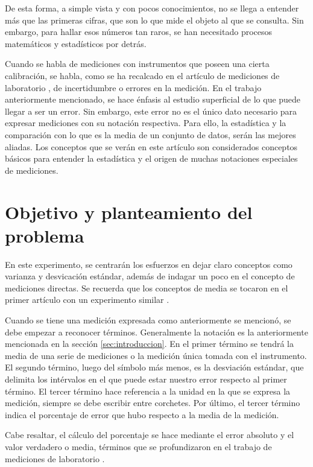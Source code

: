 \documentclass[%
 reprint,
groupedaddress,
unsortedaddress,
 amsmath,amssymb,
 aps,
superscriptaddress
]{revtex4-2}
\begin{document}
De esta forma, a simple vista y con pocos conocimientos, no se llega a entender más que las primeras cifras, que son lo que mide el objeto al que se consulta. Sin embargo, para hallar esos números tan raros, se han necesitado procesos matemáticos y estadísticos por detrás.

Cuando se habla de mediciones con instrumentos que poseen una cierta calibración, se habla, como se ha recalcado en el artículo de mediciones de laboratorio \cite{trabajopasado}, de incertidumbre o errores en la medición. En el trabajo anteriormente mencionado, se hace énfasis al estudio superficial de lo que puede llegar a ser un error. Sin embargo, este error no es el único dato necesario para expresar mediciones con su notación respectiva. Para ello, la estadística y la comparación con lo que es la media de un conjunto de datos, serán las mejores aliadas. Los conceptos que se verán en este artículo son considerados conceptos básicos para entender la estadística y el origen de muchas notaciones especiales de mediciones.

\section{Objetivo y planteamiento del problema}
\label{sec:obj}
En este experimento, se centrarán los esfuerzos en dejar claro conceptos como varianza y desvicación estándar, además de indagar un poco en el concepto de mediciones directas.
Se recuerda que los conceptos de media se tocaron en el primer artículo con un experimento similar \cite{trabajopasado}.

Cuando se tiene una medición expresada como anteriormente se mencionó, se debe empezar a reconocer términos. Generalmente la notación es la anteriormente mencionada en la sección \ref{sec:introduccion}.
En el primer término se tendrá la media de una serie de mediciones o la medición única tomada con el instrumento. El segundo término, luego del símbolo más menos, es la desviación estándar, que delimita los intérvalos en el que puede estar nuestro error respecto al primer término. El tercer término hace referencia a la unidad en la que se expresa la medición, siempre se debe escribir entre corchetes. Por último, el tercer término indica el porcentaje de error que hubo respecto a la media de la medición.

Cabe resaltar, el cálculo del porcentaje se hace mediante el error absoluto y el valor verdadero o media, términos que se profundizaron en el trabajo de mediciones de laboratorio \cite{trabajopasado}.
\end{document}
